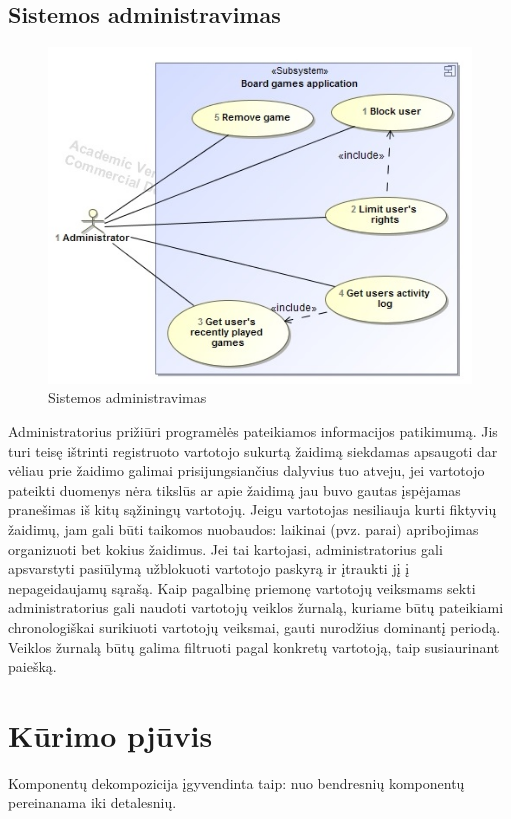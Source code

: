 \documentclass{VUMIFPSkursinis}
\begin{document}
	\subsection{Sistemos administravimas}
		\begin{figure}[H]
			\centering
			\includegraphics[scale=0.6]{img/UzduociuDiagrama3}
			\caption{Sistemos administravimas}
			\label{img:UzduociuDiagrama3}
		\end{figure}
		Administratorius prižiūri programėlės pateikiamos informacijos patikimumą. Jis turi teisę ištrinti registruoto vartotojo sukurtą žaidimą siekdamas apsaugoti dar vėliau prie žaidimo galimai prisijungsiančius dalyvius tuo atveju, jei vartotojo pateikti duomenys nėra tikslūs ar apie žaidimą jau buvo gautas įspėjamas pranešimas iš kitų sąžiningų vartotojų. Jeigu vartotojas nesiliauja kurti fiktyvių žaidimų, jam gali būti taikomos nuobaudos: laikinai (pvz. parai) apribojimas organizuoti bet kokius žaidimus. Jei tai kartojasi, administratorius gali apsvarstyti pasiūlymą užblokuoti vartotojo paskyrą ir įtraukti jį į nepageidaujamų sąrašą. Kaip pagalbinę priemonę vartotojų veiksmams sekti administratorius gali naudoti vartotojų veiklos žurnalą, kuriame būtų pateikiami chronologiškai surikiuoti vartotojų veiksmai, gauti nurodžius dominantį periodą. Veiklos žurnalą būtų galima filtruoti pagal konkretų vartotoją, taip susiaurinant paiešką.		

\section{Kūrimo pjūvis}
Komponentų dekompozicija įgyvendinta taip: nuo bendresnių komponentų pereinanama iki detalesnių.
\end{document}

